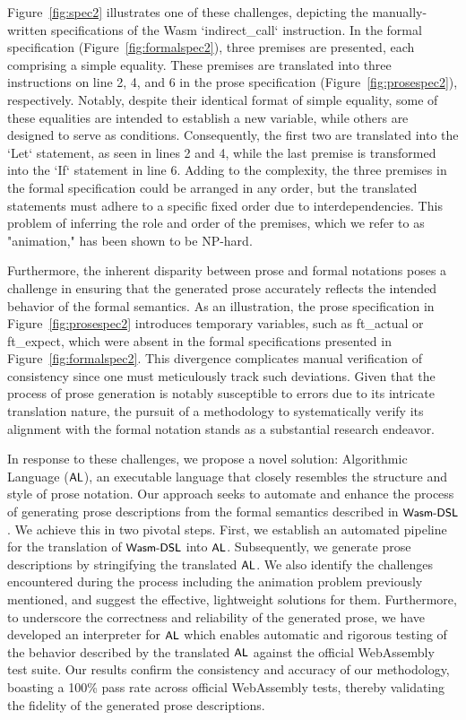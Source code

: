 Figure~\ref{fig:spec2} illustrates one of these challenges, depicting the
manually-written specifications of the Wasm `indirect\_call` instruction. In
the formal specification (Figure~\ref{fig:formalspec2}), three premises are
presented, each comprising a simple equality. These premises are translated
into three instructions on line 2, 4, and 6 in the prose specification
(Figure~\ref{fig:prosespec2}), respectively. Notably, despite their identical
format of simple equality, some of these equalities are intended to establish a
new variable, while others are designed to serve as conditions. Consequently,
the first two are translated into the `Let` statement, as seen in lines 2 and 4,
while the last premise is transformed into the `If` statement in line 6. Adding
to the complexity, the three premises in the formal specification could be
arranged in any order, but the translated statements must adhere to a specific
fixed order due to interdependencies. This problem of inferring the role and
order of the premises, which we refer to as "animation," has been shown to be
NP-hard.

Furthermore, the inherent disparity between prose and formal notations poses a
challenge in ensuring that the generated prose accurately reflects the intended
behavior of the formal semantics. As an illustration, the prose specification
in Figure~\ref{fig:prosespec2} introduces temporary variables, such as
ft\_actual or ft\_expect, which were absent in the formal specifications
presented in Figure~\ref{fig:formalspec2}. This divergence complicates manual
verification of consistency since one must meticulously track such deviations.
Given that the process of prose generation is notably susceptible to errors due
to its intricate translation nature, the pursuit of a methodology to
systematically verify its alignment with the formal notation stands as a
substantial research endeavor.

In response to these challenges, we propose a novel solution: Algorithmic
Language ($\textsf{\small AL}$), an executable language that closely resembles the structure
and style of prose notation. Our approach seeks to automate and enhance the
process of generating prose descriptions from the formal semantics described in
$\textsf{\small Wasm-DSL}$. We achieve this in two pivotal steps. First, we establish an automated
pipeline for the translation of $\textsf{\small Wasm-DSL}$ into $\textsf{\small AL}$. Subsequently, we generate
prose descriptions by stringifying the translated $\textsf{\small AL}$. We also identify the
challenges encountered during the process including the animation problem
previously mentioned, and suggest the effective, lightweight solutions for
them. Furthermore, to underscore the correctness and reliability of the
generated prose, we have developed an interpreter for $\textsf{\small AL}$ which enables
automatic and rigorous testing of the behavior described by the translated
$\textsf{\small AL}$ against the official WebAssembly test suite. Our results confirm the
consistency and accuracy of our methodology, boasting a 100\% pass rate across
official WebAssembly tests, thereby validating the fidelity of the generated
prose descriptions.

